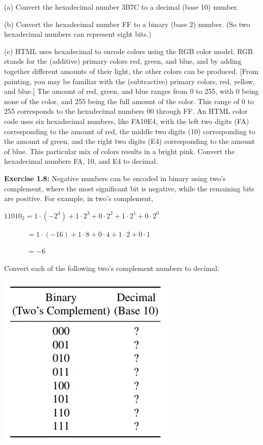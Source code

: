 \documentclass[12pt]{article}
\begin{document}
(a) Convert the hexadecimal number 3B7C to a decimal (base 10) number.

(b) Convert the hexadecimal number FF to a binary (base 2) number. (So two hexadecimal numbers can represent eight bits.)

(c) HTML uses hexadecimal to encode colors using the RGB color model. RGB stands for the (additive) primary colors red, green, and blue, and by adding together different amounts of their light, the other colors can be produced. [From painting, you may be familiar with the (subtractive) primary colors, red, yellow, and blue.] The amount of red, green, and blue ranges from 0 to 255, with 0 being none of the color, and 255 being the full amount of the color. This range of 0 to 255 corresponds to the hexadecimal numbers 00 through FF. An HTML color code uses six hexadecimal numbers, like FA10E4, with the left two digits (FA) corresponding to the amount of red, the middle two digits (10) corresponding to the amount of green, and the right two digits (E4) corresponding to the amount of blue. This particular mix of colors results in a bright pink. Convert the hexadecimal numbers FA, 10, and E4 to decimal.

\textbf{Exercise 1.8:} Negative numbers can be encoded in binary using two’s complement, where the most significant bit is negative, while the remaining bits are positive. For example, in two’s complement, 

\(11010_{2} = 1 \cdot (-2^{4}) + 1 \cdot 2^{3} + 0 \cdot 2^{2} + 1 \cdot 2^{1} + 0 \cdot 2^{0}\)

\(\quad\quad\quad\,= 1 \cdot (-16) + 1 \cdot 8 + 0 \cdot 4 + 1 \cdot 2 + 0 \cdot 1\)

\(\quad\quad\quad\,= - 6 \)

Convert each of the following two’s complement numbers to decimal:

\begin{center}
	\includegraphics[width=0.5\linewidth]{figuras/exe_1-8}
\end{center}
\end{document}
